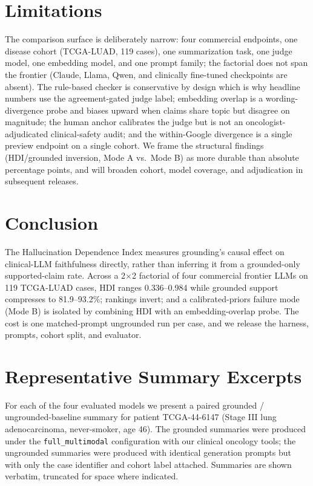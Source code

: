 \documentclass{article}
\theoremstyle{plain}
\begin{document}
\section*{Limitations}
\label{sec:limitations}

The comparison surface is deliberately narrow: four commercial endpoints, one disease cohort (TCGA-LUAD, 119 cases), one summarization task, one judge model, one embedding model, and one prompt family; the factorial does not span the frontier (Claude, Llama, Qwen, and clinically fine-tuned checkpoints are absent). The rule-based checker is conservative by design which is why headline numbers use the agreement-gated judge label; embedding overlap is a wording-divergence probe and biases upward when claims share topic but disagree on magnitude; the human anchor calibrates the judge but is not an oncologist-adjudicated clinical-safety audit; and the within-Google divergence is a single preview endpoint on a single cohort. We frame the structural findings (HDI/grounded inversion, Mode A vs.\ Mode B) as more durable than absolute percentage points, and will broaden cohort, model coverage, and adjudication in subsequent releases.

\section{Conclusion}
\label{sec:conclusion}

The Hallucination Dependence Index measures grounding's causal effect on clinical-LLM faithfulness directly, rather than inferring it from a grounded-only supported-claim rate. Across a 2$\times$2 factorial of four commercial frontier LLMs on 119 TCGA-LUAD cases, HDI ranges 0.336--0.984 while grounded support compresses to 81.9--93.2\%; rankings invert; and a calibrated-priors failure mode (Mode B) is isolated by combining HDI with an embedding-overlap probe. The cost is one matched-prompt ungrounded run per case, and we release the harness, prompts, cohort split, and evaluator.

\nocite{*}



\appendix

\section{Representative Summary Excerpts}
\label{app:excerpts}

For each of the four evaluated models we present a paired grounded / ungrounded-baseline summary for patient TCGA-44-6147 (Stage III lung adenocarcinoma, never-smoker, age 46). The grounded summaries were produced under the \texttt{full\_multimodal} configuration with our clinical oncology tools; the ungrounded summaries were produced with identical generation prompts but with only the case identifier and cohort label attached. Summaries are shown verbatim, truncated for space where indicated.
\end{document}
